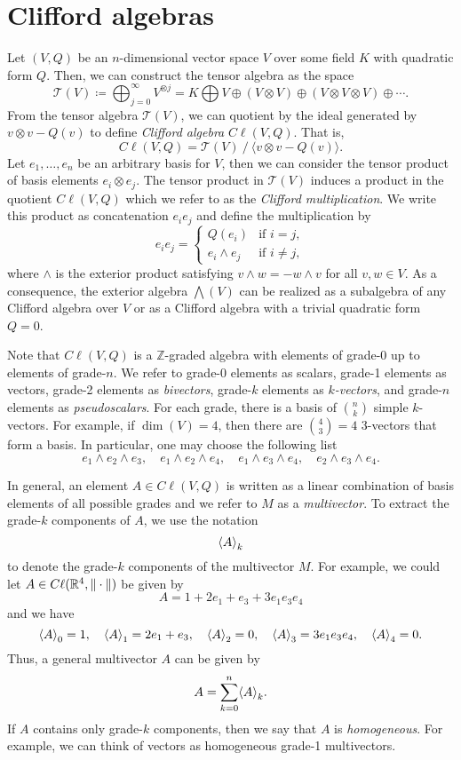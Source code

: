 \documentclass[12pt]{article}
\begin{document}
\section{Clifford algebras}

Let $(V,Q)$ be an $n$-dimensional vector space $V$ over some field $K$ with quadratic form $Q$.  Then, we can construct the tensor algebra as the space
\[
\mathcal{T}(V) \coloneqq \bigoplus_{j=0}^\infty V^{\otimes j} = K \bigoplus V \oplus (V\otimes V) \oplus (V\otimes V \otimes V) \oplus \cdots.
\]
From the tensor algebra $\mathcal{T}(V)$, we can quotient by the ideal generated by $v\otimes v - Q(v)$ to define \emph{Clifford algebra} $C\ell(V,Q)$. That is, 
\[
C\ell(V,Q) = \mathcal{T}(V) ~ / ~ \langle v \otimes v - Q(v) \rangle.
\]
Let $e_1, \dots, e_n$ be an arbitrary basis for $V$, then we can consider the tensor product of basis elements $e_i \otimes e_j$.  The tensor product in $\mathcal{T}(V)$ induces a product in the quotient $C\ell(V,Q)$ which we refer to as the \emph{Clifford multiplication}. We write this product as concatenation $e_ie_j$ and define the multiplication by
\[
e_i e_j = \begin{cases} Q(e_i) & \textrm{if $i=j$}, \\ e_i \wedge e_j & \textrm{if $i\neq j$},\end{cases}
\]
where $\wedge$ is the exterior product satisfying $v\wedge w = - w\wedge v$ for all $v,w\in V$.  As a consequence, the exterior algebra $\bigwedge(V)$ can be realized as a subalgebra of any Clifford algebra over $V$ or as a Clifford algebra with a trivial quadratic form $Q=0$.  

Note that $C\ell(V,Q)$ is a $\mathbb{Z}$-graded algebra with elements of grade-0 up to elements of grade-$n$. We refer to grade-0 elements as scalars, grade-1 elements as vectors, grade-2 elements as \emph{bivectors}, grade-$k$ elements as \emph{$k$-vectors}, and grade-$n$ elements as \emph{pseudoscalars}.   For each grade, there is a basis of ${n\choose k}$ simple $k$-vectors.  For example, if $\dim(V)=4$, then there are ${4\choose 3}=4$ 3-vectors that form a basis. In particular, one may choose the following list
\[
\label{eq:4_dim_basis}
e_1 \wedge e_2 \wedge e_3, \quad e_1 \wedge e_2 \wedge e_4, \quad e_1 \wedge e_3 \wedge e_4, \quad e_2 \wedge e_3 \wedge e_4.
\]

In general, an element $A \in C\ell(V,Q)$ is written as a linear combination of basis elements of all possible grades and we refer to $M$ as a \emph{multivector}.  To extract the grade-$k$ components of $A$, we use the notation
\[
\proj{k}{A}
\]
to denote the grade-$k$ components of the multivector $M$. For example, we could let $A\in C\ell(\R^4, \|\cdot \|)$ be given by
\[
A= 1 + 2e_1+e_3 + 3e_1e_3e_4
\]
and we have
\[
\proj{0}{A}=1, \quad \proj{1}{A}=2e_1+e_3, \quad \proj{2}{A}=0, \quad \proj{3}{A} = 3e_1e_3e_4, \quad \proj{4}{A}=0.
\]
Thus, a general multivector $A$ can be given by
\[
A = \sum_{k=0}^n \proj{k}{A}.
\]
If $A$ contains only grade-$k$ components, then we say that $A$ is \emph{homogeneous}.  For example, we can think of vectors as homogeneous grade-1 multivectors. 
\end{document}
